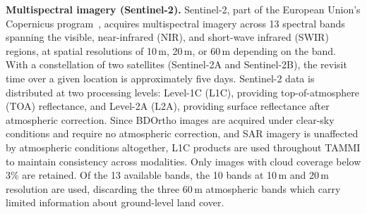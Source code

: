 \textbf{Multispectral imagery (Sentinel-2).} Sentinel-2,
part of the European Union's Copernicus
program~\cite{sentinel2}, acquires multispectral imagery
across 13 spectral bands spanning the visible, near-infrared
(NIR), and short-wave infrared (SWIR) regions, at spatial
resolutions of 10\,m, 20\,m, or 60\,m depending on the band.
With a constellation of two satellites (Sentinel-2A and
Sentinel-2B), the revisit time over a given location is
approximately five days. Sentinel-2 data is distributed at
two processing levels: Level-1C (L1C), providing
top-of-atmosphere (TOA) reflectance, and Level-2A (L2A),
providing surface reflectance after atmospheric correction.
Since BDOrtho images are acquired under clear-sky conditions
and require no atmospheric correction, and SAR imagery is
unaffected by atmospheric conditions altogether, L1C products
are used throughout TAMMI to maintain consistency across
modalities. Only images with cloud coverage below 3\% are
retained. Of the 13 available bands, the 10 bands at 10\,m
and 20\,m resolution are used, discarding the three 60\,m
atmospheric bands which carry limited information about
ground-level land cover.


